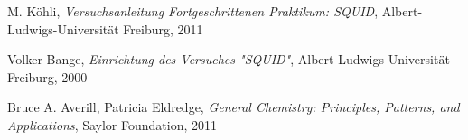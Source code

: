 \documentclass[12pt]{article}
\begin{document}
\newpage
\thispagestyle{empty}
\begin{thebibliography}{9}

  

  
  

M. Köhli,
\emph{Versuchsanleitung Fortgeschrittenen Praktikum: SQUID},
Albert-Ludwigs-Universität Freiburg,
2011

Volker Bange,
\emph{Einrichtung des Versuches "SQUID"},
Albert-Ludwigs-Universität Freiburg,
2000

Bruce A. Averill, Patricia Eldredge,
\emph{General Chemistry: Principles, Patterns, and Applications},
Saylor Foundation,
2011
\end{thebibliography}
\end{document}
